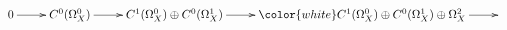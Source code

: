 \documentclass{beamer}
\begin{document}
\begin{frame}
{\begin{displaymath}
\xymatrix{
0 \ar[r]  & C^0(\Omega_X^0) \ar[r] & C^1(\Omega_X^0) \oplus C^0(\Omega_X^1)  \ar@[white][r] & {\color{white} C^1(\Omega_X^0) \oplus C^0(\Omega_X^1) \oplus \Omega_X^2} \ar@[white][r] &
}
\end{displaymath}}

%
\end{frame}




%
%
\end{document}
